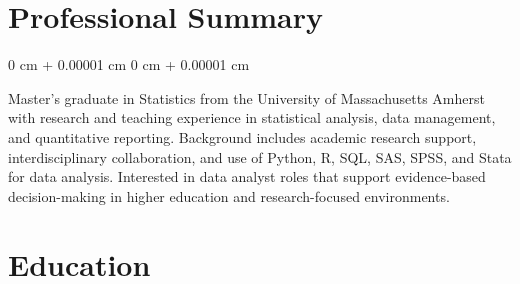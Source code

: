\documentclass[10pt, letterpaper]{article}
\newenvironment{highlightsforbulletentries}{
    \begin{itemize}[
        topsep=0.10 cm,
        parsep=0.10 cm,
        partopsep=0pt,
        itemsep=0pt,
        leftmargin=10pt
    ]
}{
    \end{itemize}
} %
\newenvironment{onecolentry}{
    \begin{adjustwidth}{
        0 cm + 0.00001 cm
    }{
        0 cm + 0.00001 cm
    }
}{
    \end{adjustwidth}
} %
\begin{document}
    









    \section{Professional Summary}

        \begin{onecolentry}
            \justifying
            Master's graduate in Statistics from the University of Massachusetts Amherst with research and teaching experience in statistical analysis, data management, and quantitative reporting. Background includes academic research support, interdisciplinary collaboration, and use of Python, R, SQL, SAS, SPSS, and Stata for data analysis. Interested in data analyst roles that support evidence-based decision-making in higher education and research-focused environments.
        \end{onecolentry}

    \section{Education}
\end{document}

